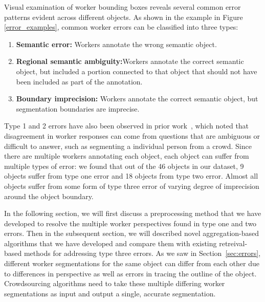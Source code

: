 Visual examination of worker bounding boxes reveals several common error patterns evident across different objects. As shown in the example in Figure \ref{error_examples}, common worker errors can be classified into three types:
\begin{enumerate}
	\item \textbf{Semantic error:} Workers annotate the wrong semantic object.
	\item \textbf{Regional semantic ambiguity:}Workers annotate the correct semantic object, but included a portion connected to that object that should not have been included as part of the annotation.
	\item \textbf{Boundary imprecision:} Workers annotate the correct semantic object, but segmentation boundaries are imprecise. %
\end{enumerate}
Type 1 and 2 errors have also been observed in prior work~\cite{Sorokin2008,Lin2014,Gurari2018}, which noted that disagreement in worker responses can come from questions that are ambiguous or difficult to answer, such as segmenting a individual person from a crowd. Since there are multiple workers annotating each object, each object can suffer from multiple types of error: we found that out of the 46 objects in our dataset, 9 objects suffer from type one error and 18 objects from type two error. Almost all objects suffer from some form of type three error of varying degree of imprecision around the object boundary. 
\par In the following section, we will first discuss a preprocessing method that we have developed to resolve the multiple worker perspectives found in type one and two errors. Then in the subsequent section, we will described novel aggregation-based algorithms that we have developed and compare them with existing retreival-based methods for addressing type three errors.
As we saw in Section~\ref{sec:errors}, different worker segmentations for the same object can differ from each other due to differences in perspective as well as errors in tracing the outline of the object. Crowdsourcing algorithms need to take these multiple differing worker segmentations as input and output a single, accurate segmentation. 
